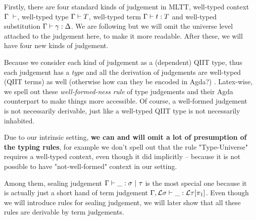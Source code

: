 Firstly, there are four standard kinds of judgement in MLTT, well-typed context $\goodCtx{\Gamma}{l}$, well-typed type $\goodType{\Gamma}{T}{l}$, well-typed term $\goodTerm{\Gamma}{t}{T}$ and well-typed substitution $\goodSub{\Gamma}{\gamma}{\Delta}$. We are following \citep{kaposi2019gluing} but we will omit the universe level attached to the judgement here, to make it more readable. After these, we will have four new kinds of judgement. 

Because we consider each kind of judgement as a (dependent) QIIT type, thus each judgement has a \textit{type} and all the derivation of judgements are well-typed (QIIT terms) as well (otherwise how can they be encoded in Agda?)
.
Latex-wise, we spell out these \textit{well-formed-ness rule} of type judgements and their Agda counterpart to make things more accessible. Of course, a well-formed judgement is not necessarily derivable, just like a well-typed QIIT type is not necessarily inhabited. 

Due to our intrinsic setting, \textbf{we can and will omit a lot of presumption of the typing rules}, for example we don't spell out that the rule "Type-Universe" requires a well-typed context, even though it did implicitly -- because it is not possible to have "not-well-formed" context in our setting.

Among them, sealing judgement $\goodSeal{\Gamma}{\_}{\sigma}{\tau}$ is the most special one because it is actually just a short hand of term judgement $\goodTerm{\Gamma , \cL \sigma}{\_}{\cL\tau[\pi_1]}$. Even though we will introduce rules for sealing judgement, we will later show that all these rules are derivable by term judgements.

